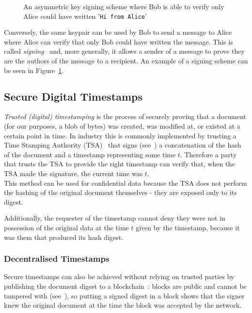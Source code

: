 \begin{figure}[th]
\begin{tikzpicture}[x=0.75pt,y=0.75pt,yscale=-1,xscale=1]
    \end{tikzpicture}
    \decoRule
    \caption[Asymmetric signing scheme]{An asymmetric key signing scheme where Bob is able to verify only Alice could
    have written '\texttt{Hi from Alice}'}
    \label{fig:pubkey-signing}
\end{figure}

Conversely, the same keypair can be used by Bob to send a message to Alice where Alice can verify that only Bob
could have written the message.
This is called \textit{signing}~\cite{smart2016signatures} and, more generally, it allows a sender of a message to
prove they are the authors of the message to a recipient.
An example of a signing scheme can be seen in Figure~\ref{fig:pubkey-signing}.

\subsection{Secure Digital Timestamps}\label{subsec:crypto:timestamps}
\textit{Trusted (digital) timestamping} is the process of securely proving that a document (for our purposes, a blob of
bytes) was created, was modified at, or existed at a certain point in time.
In industry this is commonly implemented by trusting a Time Stamping Authority (TSA)~\cite{timestamps_tsp_rfc} that
signs (see~) a concatenation of the hash of the document and a timestamp representing some
time $t$.
Therefore a party that trusts the TSA to provide the right timestamp can verify that, when the TSA made the signature,
the current time was $t$.
\\

This method can be used for confidential data because the TSA does not perform the hashing of the original document
themselves - they are exposed only to its digest.

Additionally, the requester of the timestamp cannot deny they were not in possession of the original data at the time
$t$ given by the timestamp, because it was them that produced its hash digest.

\subsubsection{Decentralised Timestamps}

Secure timestamps can also be achieved without relying on trusted parties by publishing the document digest to a
blockchain~\cite{gipp2015timestamps_btc}: blocks are public and cannot be tampered with (see~),
so putting a signed digest in a block shows that the signer knew the original document at the time the block was
accepted by the network.


